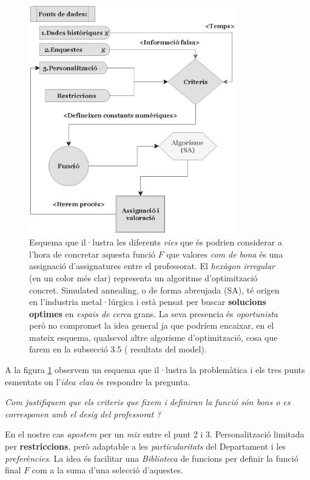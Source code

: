 \documentclass[10pt,twocolumn]{article}
\begin{document}
\begin{figure}
	\centering
	\includegraphics[width=9cm]{algor_bl}
	\caption{ \footnotesize Esquema que il·lustra les diferents \textit{vies} que és podrien considerar a l'hora de concretar aquesta funció $F$ que valores \textit{com de bona}  és una assignació d'assignatures entre el professorat. El \textit{hexàgon irregular}   (en un color més clar) representa un algoritme d'optimització concret. Simulated annealing, o de forma abreujada (SA), té origen en l'industria metal·lúrgica i està pensat per buscar \textbf{solucions optimes} en \textit{espais de cerca} grans. La seva presencia és \textit{oportunista} però no compromet la idea general ja que podríem encaixar, en el mateix esquema, qualsevol altre algorisme d'optimització, cosa que farem en la subsecció 3.5 ( resultats del model).}
	\label{fig:4}
\end{figure}
A la figura \ref{fig:4} observem un esquema que il·lustra la problemàtica i els tres punts esmentats on  l'\textit{idea clau} és respondre la pregunta.
\vspace{1mm}

\textit{Com justifiquem que els criteris que fixem i definiran la funció són bons o es corresponen amb el desig del professorat ?} 
 
\vspace{1mm}
En el nostre cas \textit{apostem} per un \textit{mix} entre el punt 2 i 3. Personalització limitada per \textbf{restriccions}, però adaptable a les \textit{particularitats} del Departament i les \textit{preferències}. La idea és facilitar una \textit{Biblioteca} de funcions per definir la funció final $F$ com a la suma d'una selecció d'aquestes.
\end{document}

